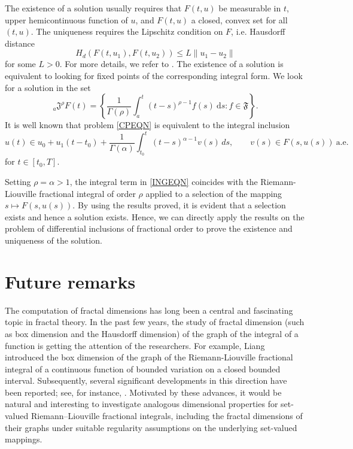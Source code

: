 \documentclass[a4paper,12pt,reqno]{amsart}
\numberwithin{equation}{section}
\theoremstyle{definition}
\theoremstyle{remark}
\numberwithin{equation}{section}
\begin{document}
 The existence of a solution  usually requires that $F(t, u)$ be measurable in $t$, upper hemicontinuous function of $u$, and $F(t, u)$ a closed, convex set for all $(t,u)$. The uniqueness requires the Lipschitz condition on $F$, i.e. Hausdorff distance
 $$H_d(F(t, u_1), F(t, u_2)) \leq L \|u_1 - u_2\|$$ for some $L > 0$. For more details, we refer to \cite{incl}. The existence of a solution is equivalent to looking for fixed points of the corresponding integral form. We look for a solution in the set $$_{a}\mathfrak{J}^{\rho}F(t)=\left\{\frac{1}{\Gamma(\rho)}\int_{a}^{t}(t-s)^{\rho-1}f(s)~\mathrm{d}s : f\in \mathfrak{F}\right\}.$$ 
 It is well known that problem \eqref{CPEQN} is equivalent to
the integral inclusion
\begin{equation}\label{INGEQN}
u(t)\in u_{0}+u_{1}(t-t_{0})
+\frac{1}{\Gamma(\alpha)}
\int_{t_{0}}^{t}(t-s)^{\alpha-1}v(s)\,ds,
\qquad v(s)\in F(s,u(s))\ \text{a.e.}
\end{equation}
for $t\in[t_{0},T]$.

Setting $\rho=\alpha>1$, the integral term in \eqref{INGEQN}
coincides with the Riemann-Liouville fractional integral of order $\rho$
applied to a selection of the mapping $s\mapsto F(s,u(s))$. By using the results proved, it is evident that a selection exists and hence a solution exists. Hence, we can directly apply the results on the problem of differential inclusions of fractional order to prove the existence and uniqueness of the solution.
\\
\section{Future remarks}
The computation of fractal dimensions has long been a central and fascinating topic in fractal theory. In the past few years, the study of fractal dimension (such as box dimension and the Hausdorff dimension) of the graph of the integral of a function is getting the attention of the researchers. For example, Liang \cite{L1} introduced the box dimension of the graph of the Riemann-Liouville fractional integral of a continuous function of bounded variation on a closed bounded interval. Subsequently, several significant developments in this direction have been reported; see, for instance, \cite{SS, SSS, SS1, L2, MV, SV,SV1, BY, BY1}. Motivated by these advances, it would be natural and interesting to investigate analogous dimensional properties for set-valued Riemann–Liouville fractional integrals, including the fractal dimensions of their graphs under suitable regularity assumptions on the underlying set-valued mappings.
\end{document}
